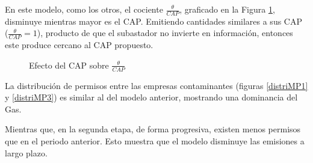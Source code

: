 En este modelo, como los otros, el cociente $\frac{\theta}{CAP}$, graficado en la Figura \ref{rendcapMP2}, disminuye mientras mayor es el CAP. Emitiendo cantidades similares a sus CAP ($\frac{\theta}{CAP} = 1$), producto de que el subastador no invierte en información, entonces este produce cercano al CAP propuesto.
\vspace{2.5mm}


\begin{figure}[H]
\centering
{}
\caption{{\footnotesize Efecto del CAP sobre $\frac{\theta}{CAP}$}}
\label{rendcapMP2}
\end{figure}

La distribución de permisos entre las empresas contaminantes (figuras \ref{distriMP1} y \ref{distriMP3}) es similar al del modelo anterior, mostrando una dominancia del Gas.
\vspace{2.5mm}

Mientras que, en la segunda etapa, de forma progresiva, existen menos permisos que en el periodo anterior. Esto muestra que el modelo disminuye las emisiones a largo plazo.

